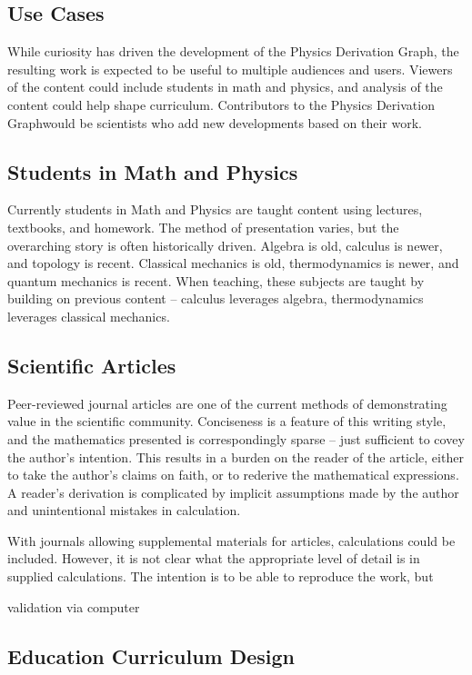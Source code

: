 \documentclass{article}
\newcommand{\pdg}{Physics Derivation Graph}
\begin{document}
\begin{multicols}{2}
\section{Use Cases\label{sec:use_cases}}

While curiosity has driven the development of the \pdg, the resulting work is expected to be useful to multiple audiences and users. Viewers of the content could include students in math and physics, and analysis of the content could help shape curriculum. Contributors to the \pdg would be scientists who add new developments based on their work.

\subsection{Students in Math and Physics}

Currently students in Math and Physics are taught content using lectures, textbooks, and homework. The method of presentation varies, but the overarching story is often historically driven. Algebra is old, calculus is newer, and topology is recent. Classical mechanics is old, thermodynamics is newer, and quantum mechanics is recent. When teaching, these subjects are taught by building on previous content -- calculus leverages algebra, thermodynamics leverages classical mechanics. 

\subsection{Scientific Articles}

Peer-reviewed journal articles are one of the current methods of demonstrating value in the scientific community. Conciseness is a feature of this writing style, and the mathematics presented is correspondingly sparse -- just sufficient to covey the author's intention. This results in a burden on the reader of the article, either to take the author's claims on faith, or to rederive the mathematical expressions. A reader's derivation is complicated by implicit assumptions made by the author and unintentional mistakes in calculation. 

With journals allowing supplemental materials for articles, calculations could be included. However, it is not clear what the appropriate level of detail is in supplied calculations. The intention is to be able to reproduce the work, but 

validation via computer 

\subsection{Education Curriculum Design}


\end{multicols}
\end{document}
